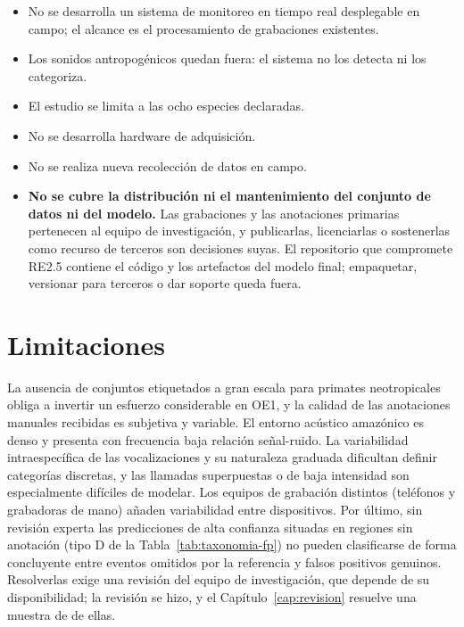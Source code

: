 \begin{itemize}[nosep]
    \item No se desarrolla un sistema de monitoreo en tiempo real desplegable en
          campo; el alcance es el procesamiento de grabaciones existentes.
    \item Los sonidos antropogénicos quedan fuera: el sistema no los detecta ni
          los categoriza.
    \item El estudio se limita a las ocho especies declaradas.
    \item No se desarrolla hardware de adquisición.
    \item No se realiza nueva recolección de datos en campo.
    \item \textbf{No se cubre la distribución ni el mantenimiento del conjunto de
          datos ni del modelo.} Las grabaciones y las anotaciones primarias
          pertenecen al equipo de investigación, y publicarlas, licenciarlas o
          sostenerlas como recurso de terceros son decisiones
          suyas. El repositorio que compromete RE2.5 contiene el código y los
          artefactos del modelo final; empaquetar, versionar para terceros o dar
          soporte queda fuera.
\end{itemize}

\section{Limitaciones}

La ausencia de conjuntos etiquetados a gran escala para
primates neotropicales obliga a invertir un esfuerzo considerable en OE1, y la
calidad de las anotaciones manuales recibidas es subjetiva y variable. El
entorno acústico amazónico es denso y presenta con frecuencia baja relación
señal-ruido. La variabilidad intraespecífica de las vocalizaciones y su
naturaleza graduada dificultan definir categorías discretas, y las llamadas
superpuestas o de baja intensidad son especialmente difíciles de modelar. Los
equipos de grabación distintos (teléfonos y grabadoras de mano) añaden variabilidad entre dispositivos. Por último, sin
revisión experta las predicciones de alta confianza situadas en regiones sin
anotación (tipo D de la Tabla~\ref{tab:taxonomia-fp}) no pueden clasificarse de
forma concluyente entre eventos omitidos por la referencia y falsos positivos
genuinos. Resolverlas exige una revisión del equipo de investigación, que
depende de su disponibilidad; la revisión se hizo, y el
Capítulo~\ref{cap:revision} resuelve una muestra de \uNoneSample{} de ellas.

